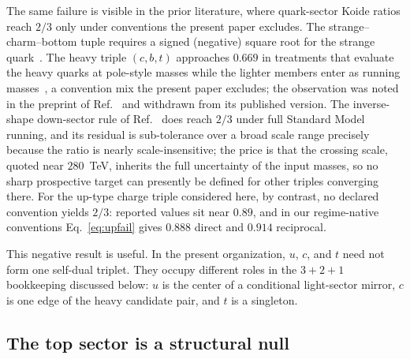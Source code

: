 \documentclass[aps,twocolumn,superscriptaddress,nofootinbib,floatfix]{revtex4-2}
\begin{document}
The same failure is visible in the prior literature, where quark-sector Koide ratios reach $2/3$ only under conventions the present paper excludes. The strange--charm--bottom tuple requires a signed (negative) square root for the strange quark~\cite{Rivero2011}. The heavy triple $(c,b,t)$ approaches $0.669$ in treatments that evaluate the heavy quarks at pole-style masses while the lighter members enter as running masses~\cite{Cao2012,RodejohannZhang2011}, a convention mix the present paper excludes; the observation was noted in the preprint of Ref.~\cite{RodejohannZhang2011} and withdrawn from its published version. The inverse-shape down-sector rule of Ref.~\cite{Rivero2026} does reach $2/3$ under full Standard Model running, and its residual is sub-tolerance over a broad scale range precisely because the ratio is nearly scale-insensitive; the price is that the crossing scale, quoted near $280$~TeV, inherits the full uncertainty of the input masses, so no sharp prospective target can presently be defined for other triples converging there. For the up-type charge triple considered here, by contrast, no declared convention yields $2/3$: reported values sit near $0.89$, and in our regime-native conventions Eq.~\eqref{eq:upfail} gives $0.888$ direct and $0.914$ reciprocal.

This negative result is useful. In the present organization, $u$, $c$, and $t$ need not form one self-dual triplet. They occupy different roles in the $3+2+1$ bookkeeping discussed below: $u$ is the center of a conditional light-sector mirror, $c$ is one edge of the heavy candidate pair, and $t$ is a singleton.

\subsection{The top sector is a structural null}
\label{sec:topnull}
\end{document}
